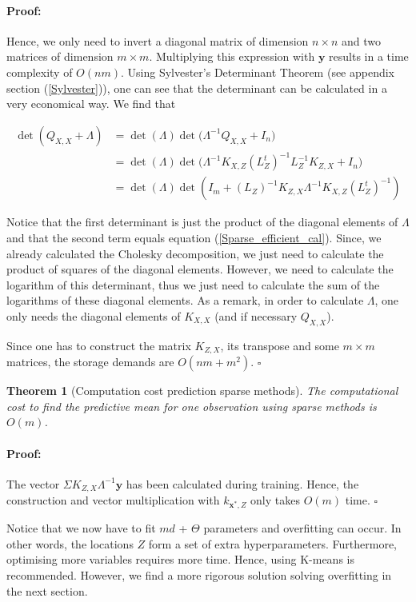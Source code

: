 \documentclass[12pt,a4paper,oneside]{book}
\newtheorem{Theorem}{Theorem}
\newenvironment{proof}{\paragraph{Proof:}}{\hfill$\square$}
\begin{document}
\begin{proof}
Hence, we only need to invert a diagonal matrix of dimension $n \times n$ and two matrices of dimension $m \times m$. Multiplying this expression with $\bm{y}$ results in a time complexity of $O(nm)$. Using Sylvester’s Determinant Theorem (see appendix section (\ref{Sylvester})), one can see that the determinant can be calculated in a very economical way. We find that

\begin{equation}
\begin{aligned}
\det{(Q_{X,X} + \Lambda)} &= \det{(\Lambda)} \det({\Lambda^{-1} Q_{X,X} + I_n)} \\
&=  \det{(\Lambda)} \det{(\Lambda^{-1} K_{X,Z}} (L_{Z} ^t)^{-1} L_{Z}^{-1}  K_{Z,X} + I_{n}) \\
&= \det{(\Lambda)}  \det{( I_{m} + (L_{Z}) ^{-1} K_{Z,X} \Lambda^{-1} K_{X,Z} (L_{Z}^t)^{-1} ) }
\end{aligned}
\end{equation}

Notice that the first determinant is just the product of the diagonal elements of $\Lambda$ and that the second term equals equation (\ref{Sparse_efficient_cal}). Since, we already calculated the Cholesky decomposition, we just need to calculate the product of squares of the diagonal elements. However, we need to calculate the logarithm of this determinant, thus we just need to calculate the sum of the logarithms of these diagonal elements. As a remark, in order to calculate $\Lambda$, one only needs the diagonal elements of $K_{X,X}$ (and if necessary $Q_{X,X}$).

Since one has to construct the matrix $K_{Z,X}$, its transpose and some $m \times m$ matrices, the storage demands are $O(nm +m^2)$.
\end{proof}

\begin{Theorem}[Computation cost prediction sparse methods]
The computational cost to find the predictive mean for one observation using sparse methods is $O(m)$.
\end{Theorem}

\begin{proof}
The vector $\Sigma K_{Z,X}\Lambda^{-1} \bm{y}$ has been calculated during training. Hence, the construction and vector multiplication with $k_{\bm{x}^{\ast},Z}$ only takes $O(m)$ time. 
\end{proof}

Notice that we now have to fit $md$ + $\Theta$ parameters and overfitting can occur. In other words, the locations $Z$ form a set of extra hyperparameters. Furthermore, optimising more variables requires more time. Hence, using K-means is recommended. However, we find a more rigorous solution solving overfitting in the next section. 
\end{document}
